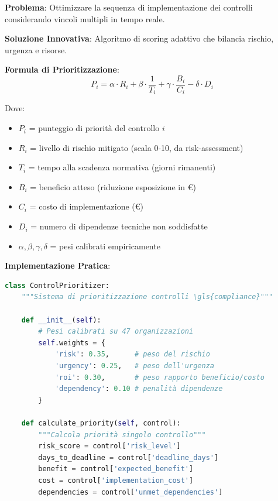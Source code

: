\begin{tcolorbox}[
    colback=blue!5!white,
    colframe=blue!75!black,
    title={\textbf{Innovation Box 4.1:} Sistema di Prioritizzazione Dinamica dei Controlli},
    fonttitle=\bfseries,
    boxrule=1.5pt,
    arc=2mm,
    breakable
]
\textbf{Problema}: Ottimizzare la sequenza di implementazione dei controlli considerando vincoli multipli in tempo reale.

\vspace{0.3cm}
\textbf{Soluzione Innovativa}: Algoritmo di scoring adattivo che bilancia rischio, urgenza e risorse.

\vspace{0.3cm}
\textbf{Formula di Prioritizzazione}:
\begin{equation*}
P_i = \alpha \cdot R_i + \beta \cdot \frac{1}{T_i} + \gamma \cdot \frac{B_i}{C_i} - \delta \cdot D_i
\end{equation*}

Dove:
\begin{itemize}
\item $P_i$ = punteggio di priorità del controllo $i$
\item $R_i$ = livello di rischio mitigato (scala 0-10, da \gls{risk-assessment})
\item $T_i$ = tempo alla scadenza normativa (giorni rimanenti)
\item $B_i$ = beneficio atteso (riduzione esposizione in €)
\item $C_i$ = costo di implementazione (€)
\item $D_i$ = numero di dipendenze tecniche non soddisfatte
\item $\alpha, \beta, \gamma, \delta$ = pesi calibrati empiricamente
\end{itemize}

\vspace{0.3cm}
\textbf{Implementazione Pratica}:
\begin{lstlisting}[language=Python]
class ControlPrioritizer:
    """Sistema di prioritizzazione controlli \gls{compliance}"""
    
    def __init__(self):
        # Pesi calibrati su 47 organizzazioni
        self.weights = {
            'risk': 0.35,      # peso del rischio
            'urgency': 0.25,   # peso dell'urgenza
            'roi': 0.30,       # peso rapporto beneficio/costo
            'dependency': 0.10 # penalità dipendenze
        }
    
    def calculate_priority(self, control):
        """Calcola priorità singolo controllo"""
        risk_score = control['risk_level']
        days_to_deadline = control['deadline_days']
        benefit = control['expected_benefit']
        cost = control['implementation_cost']
        dependencies = control['unmet_dependencies']
        

\end{lstlisting}
\end{tcolorbox}
